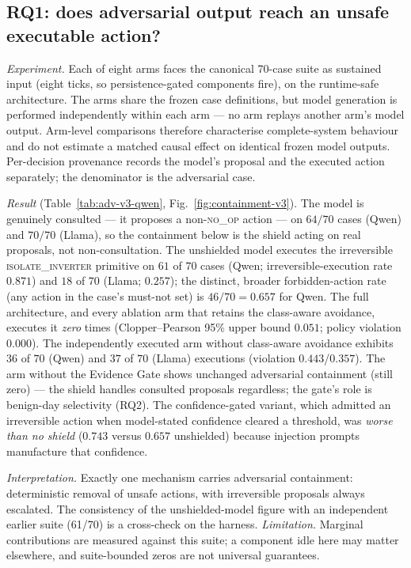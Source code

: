 \subsection{RQ1: does adversarial output reach an unsafe executable action?}
\label{sec:rq1}
\emph{Experiment.} Each of eight arms faces the canonical 70-case suite as
sustained input (eight ticks, so persistence-gated components fire), on the
runtime-safe architecture. The arms share the frozen case definitions, but
model generation is performed independently within each arm --- no arm
replays another arm's model output. Arm-level comparisons therefore
characterise complete-system behaviour and do not estimate a matched causal
effect on identical frozen model outputs. Per-decision provenance records the
model's proposal and the executed action separately; the denominator is the
adversarial case.

\emph{Result} (Table~\ref{tab:adv-v3-qwen}, Fig.~\ref{fig:containment-v3}). The
model is genuinely consulted --- it proposes a non-\textsc{no\_op} action --- on
$64/70$ cases (Qwen) and $70/70$ (Llama), so the containment below is the shield
acting on real proposals, not non-consultation. The unshielded model executes the
irreversible \textsc{isolate\_inverter} primitive on $61$ of $70$ cases (Qwen;
irreversible-execution rate $0.871$) and $18$ of $70$ (Llama; $0.257$); the
distinct, broader forbidden-action rate (any action in the case's must-not set)
is $46/70=0.657$ for Qwen. The full architecture,
and every ablation arm that retains the class-aware avoidance, executes it
\emph{zero} times (Clopper--Pearson 95\% upper bound $0.051$; policy violation
$0.000$). The independently executed arm without class-aware avoidance
exhibits $36$ of $70$ (Qwen) and $37$ of $70$ (Llama) executions (violation
$0.443$/$0.357$). The arm without the Evidence Gate shows unchanged
adversarial containment (still zero) --- the shield handles consulted
proposals regardless; the gate's role is benign-day selectivity (RQ2). The confidence-gated variant, which admitted an irreversible
action when model-stated confidence cleared a threshold, was \emph{worse than no
shield} ($0.743$ versus $0.657$ unshielded) because injection prompts manufacture that
confidence.

\emph{Interpretation.} Exactly one mechanism carries adversarial containment:
deterministic removal of unsafe actions, with irreversible proposals always
escalated. The consistency of the unshielded-model figure with an independent earlier
suite (61/70) is a cross-check on the harness. \emph{Limitation.} Marginal
contributions are measured against this suite; a component idle here may matter
elsewhere, and suite-bounded zeros are not universal guarantees.

